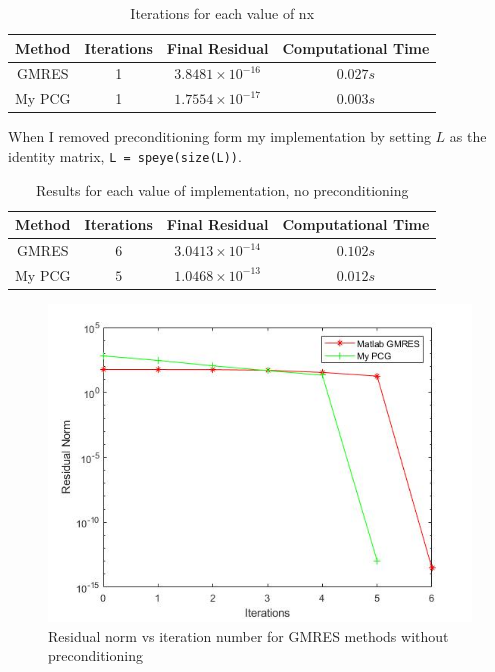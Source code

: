 \documentclass[a4paper, 11pt]{article}
\begin{document}
		\begin{table}[H]
			\centering
			\begin{tabular}{c|c|c|c}
				\textbf{Method} &  \textbf{Iterations} 	& \textbf{Final Residual} 		& \textbf{Computational Time} 	\\ \hline
				GMRES 			& 			1 			& $ 3.8481 \times 10^{-16} $	& $ 0.027 s $	\\ \hline	
				My PCG 			& 			1			& $ 1.7554 \times 10^{-17} $	& $ 0.003 s $	\\ \hline
			\end{tabular}
			\caption{Iterations for each value of nx}
			\label{table:ex6_c_prec}
		\end{table}	
	
		When I removed preconditioning form my implementation by setting $L$ as the identity matrix, \texttt{L = speye(size(L))}.
			
		\begin{table}[H]
			\centering
			\begin{tabular}{c|c|c|c}
				\textbf{Method} &  \textbf{Iterations} 	& \textbf{Final Residual} 		& \textbf{Computational Time} 	\\ \hline
				GMRES			& 			$6$ 		& $ 3.0413 \times 10^{-14} $ 	& $ 0.102 s $	\\ \hline	
				My PCG 			& 			$5$			& $ 1.0468 \times 10^{-13} $	& $ 0.012 s $	\\ \hline
			\end{tabular}
			\caption{Results for each value of implementation, no preconditioning}
			\label{table:ex6_c_NoPrec}
		\end{table}
	
		\begin{figure}[H]
			\centering
			\includegraphics[width=.6\linewidth]{ex6b.jpg}
			\caption{Residual norm vs iteration number for GMRES methods without preconditioning}
			\label{fig:ex6_c_NoPrec}
		\end{figure}
	
\end{document}
